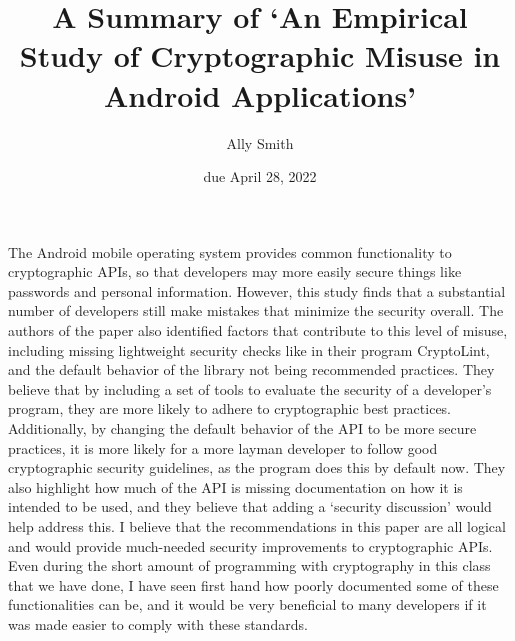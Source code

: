 \documentclass[12pt]{article}
\title{\bf A Summary of `An Empirical Study of Cryptographic Misuse in Android
Applications'}
\author{Ally Smith}
\date{due April 28, 2022}
\begin{document}
\maketitle{}

The Android mobile operating system provides common functionality to
cryptographic APIs, so that developers may more easily secure things like
passwords and personal information. However, this study finds that a substantial
number of developers still make mistakes that minimize the security overall.
The authors of the paper also identified factors that contribute to this level
of misuse, including missing lightweight security checks like in their program
CryptoLint, and the default behavior of the library not being recommended
practices. They believe that by including a set of tools to evaluate the
security of a developer's program, they are more likely to adhere to
cryptographic best practices. Additionally, by changing the default behavior of
the API to be more secure practices, it is more likely for a more layman
developer to follow good cryptographic security guidelines, as the program does
this by default now. They also highlight how much of the API is missing
documentation on how it is intended to be used, and they believe that adding
a `security discussion' would help address this. I believe that the
recommendations in this paper are all logical and would provide much-needed
security improvements to cryptographic APIs. Even during the short amount of
programming with cryptography in this class that we have done, I have seen first
hand how poorly documented some of these functionalities can be, and it would be
very beneficial to many developers if it was made easier to comply with these
standards.
\end{document}
